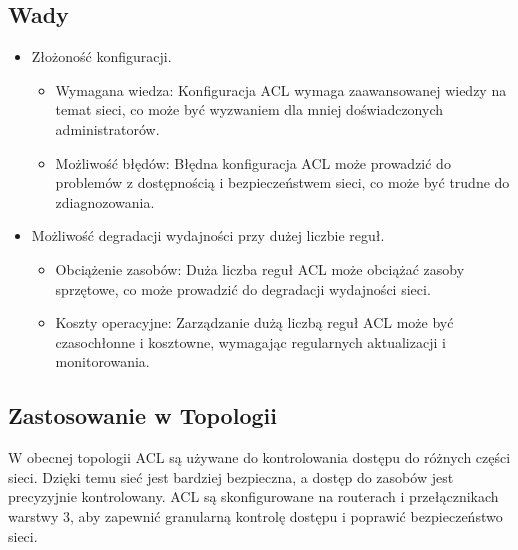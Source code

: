 \subsection{Wady}
\begin{itemize}
    \item Złożoność konfiguracji.
    \begin{itemize}
        \item Wymagana wiedza: Konfiguracja ACL wymaga zaawansowanej wiedzy na temat sieci, co może być wyzwaniem dla mniej doświadczonych administratorów.
        \item Możliwość błędów: Błędna konfiguracja ACL może prowadzić do problemów z dostępnością i bezpieczeństwem sieci, co może być trudne do zdiagnozowania.
    \end{itemize}
    \item Możliwość degradacji wydajności przy dużej liczbie reguł.
    \begin{itemize}
        \item Obciążenie zasobów: Duża liczba reguł ACL może obciążać zasoby sprzętowe, co może prowadzić do degradacji wydajności sieci.
        \item Koszty operacyjne: Zarządzanie dużą liczbą reguł ACL może być czasochłonne i kosztowne, wymagając regularnych aktualizacji i monitorowania.
    \end{itemize}
\end{itemize}

\subsection{Zastosowanie w Topologii}
W obecnej topologii ACL są używane do kontrolowania dostępu do różnych części sieci. Dzięki temu sieć jest bardziej bezpieczna, a dostęp do zasobów jest precyzyjnie kontrolowany. ACL są skonfigurowane na routerach i przełącznikach warstwy 3, aby zapewnić granularną kontrolę dostępu i poprawić bezpieczeństwo sieci.

